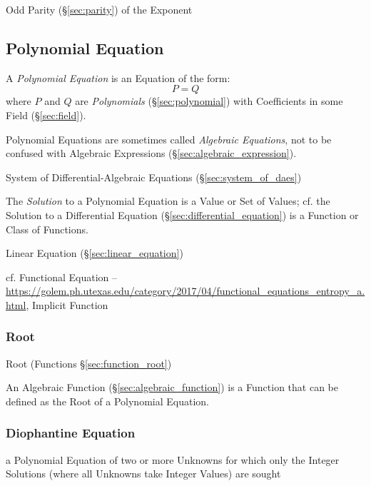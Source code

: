 Odd Parity (\S\ref{sec:parity}) of the Exponent



\subsection{Polynomial Equation}\label{sec:polynomial_equation}

A \emph{Polynomial Equation} is an Equation of the form:
\[
  P = Q
\]
where $P$ and $Q$ are \emph{Polynomials} (\S\ref{sec:polynomial}) with
Coefficients in some Field (\S\ref{sec:field}).

\fist Polynomial Equations are sometimes called \emph{Algebraic Equations}, not
to be confused with Algebraic Expressions (\S\ref{sec:algebraic_expression}).

\fist System of Differential-Algebraic Equations (\S\ref{sec:system_of_daes})

The \emph{Solution} to a Polynomial Equation is a Value or Set of Values; cf.
the Solution to a Differential Equation (\S\ref{sec:differential_equation}) is
a Function or Class of Functions.

Linear Equation (\S\ref{sec:linear_equation})

cf. Functional Equation --
\url{https://golem.ph.utexas.edu/category/2017/04/functional_equations_entropy_a.html},
Implicit Function %



\subsubsection{Root}\label{sec:equation_root}

\fist Root (Functions \S\ref{sec:function_root})

An Algebraic Function (\S\ref{sec:algebraic_function}) is a Function that can
be defined as the Root of a Polynomial Equation.



\subsubsection{Diophantine Equation}\label{sec:diophantine_equation}

a Polynomial Equation of two or more Unknowns for which only the Integer
Solutions (where all Unknowns take Integer Values) are sought


